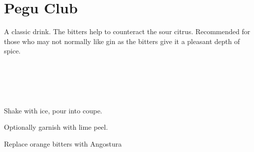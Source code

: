 \section[Pegu Club]{Pegu Club}

\begin{recipestats}[
        servings=1,
        preptime=5~\minute,
        original=\citefield{cocktailSeminars2021}{title} \cite{cocktailSeminars2021},
    ]
\end{recipestats}

\begin{recipeabstract}
    A classic drink.
    The bitters help to counteract the sour citrus.
    Recommended for those who may not normally like gin as the bitters give it
    a pleasant depth of spice.
\end{recipeabstract}

\begin{ingredientcolumns}
    \begin{ingredientblock}
        \\
        \\
    \end{ingredientblock}
    \begin{ingredientblock}
        \\
    \end{ingredientblock}
\end{ingredientcolumns}

\begin{preparation}
\item Shake with ice, pour into coupe.
\item Optionally garnish with lime peel.
\end{preparation}

\begin{variation}
\item Replace orange bitters with Angostura
\end{variation}

\recipeend
